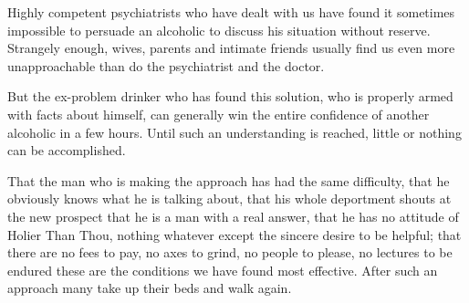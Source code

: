 \begin{biblechapter}
    Highly competent psychiatrists who have dealt with us 
    have found it sometimes impossible to persuade an alcoholic 
    to discuss his situation without reserve. 
\verse Strangely enough, wives, parents and intimate friends 
    usually find us even more unapproachable 
    than do the psychiatrist and the doctor.

\verse But the ex-problem drinker who has found this solution, 
    who is properly armed with facts about himself, 
    can generally win the entire confidence of another alcoholic 
    in a few hours. 
\verse Until such an understanding is reached, 
    little or nothing can be accomplished.

\verse That the man who is making the approach has had the same difficulty, 
    that he obviously knows what he is talking about, 
    that his whole deportment shouts at the new prospect 
    that he is a man with a real answer, 
    that he has no attitude of Holier Than Thou, 
    nothing whatever except the sincere desire to be helpful; 
    that there are no fees to pay, 
    no axes to grind, 
    no people to please, 
    no lectures to be endured 
    these are the conditions we have found most effective. 
\verse After such an approach many take up their beds and walk again.
\end{biblechapter}


